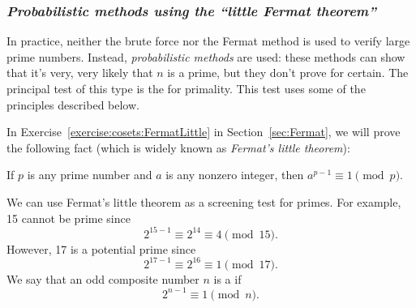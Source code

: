 \subsubsection*{\emph{Probabilistic methods using the ``little Fermat theorem''}}
In practice, neither the brute force nor the Fermat method is used to verify large prime numbers. Instead, 
\emph{probabilistic methods} are used: these methods can show that it's very, very likely that $n$ is a prime, but they don't prove for certain. The principal test of this type is the   for primality.  This test uses some of the principles described  below.	 
 
In Exercise~\ref{exercise:cosets:FermatLittle} in Section~\ref{sec:Fermat}, we will prove the following fact (which is widely known as \emph{Fermat's little theorem}): 
\medskip

If  $p$ is any prime number and $a$ is any nonzero integer, then $a^{p-1} \equiv 1 \pmod{p}$.  
\medskip

We can use Fermat's little theorem as a screening test for primes. For example, 15 cannot be prime since
$$
2^{15-1} \equiv 2^{14} \equiv 4 \pmod{15}.
$$
However, 17 is a potential prime since
$$
2^{17-1} \equiv 2^{16} \equiv 1 \pmod{17}.
$$
We say that an odd composite number $n$ is a  if 
$$
2^{n-1} \equiv 1 \pmod{n}.
$$

